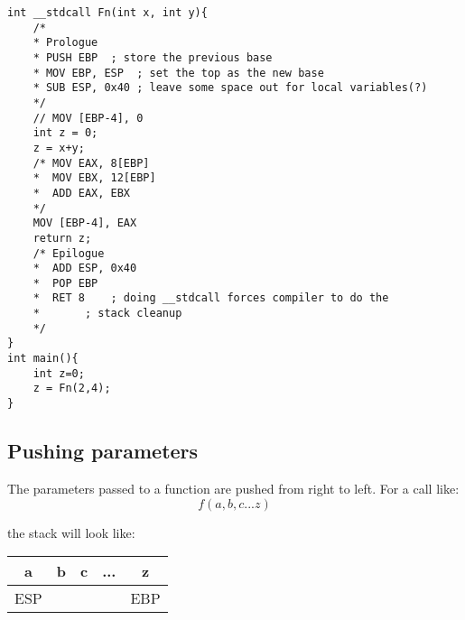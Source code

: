 \documentclass[11pt,letterpaper]{article}
\begin{document}
\begin{verbatim}
int __stdcall Fn(int x, int y){
	/*
	* Prologue
	* PUSH EBP	; store the previous base
	* MOV EBP, ESP	; set the top as the new base
	* SUB ESP, 0x40 ; leave some space out for local variables(?)
	*/
	// MOV [EBP-4], 0
	int z = 0;
	z = x+y;
	/* MOV EAX, 8[EBP]
	*  MOV EBX, 12[EBP]
	*  ADD EAX, EBX
	*/
	MOV [EBP-4], EAX
	return z;
	/* Epilogue
	*  ADD ESP, 0x40
	*  POP EBP
	*  RET 8	; doing __stdcall forces compiler to do the 
	*		; stack cleanup
	*/
}
int main(){
	int z=0;
	z = Fn(2,4);
}
\end{verbatim}


\subsection*{Pushing parameters}
The parameters passed to a function are pushed from right to left. For a call like:
\[f(a, b, c ... z)\]

the stack will look like:
\newline
\begin{center}
\begin{tabular}{|c|c|c|c|c|}
	\hline a & b & c & ... & z\\
	\hline ESP & & & & EBP \\
	\hline
\end{tabular}
\end{center}


\end{document}
